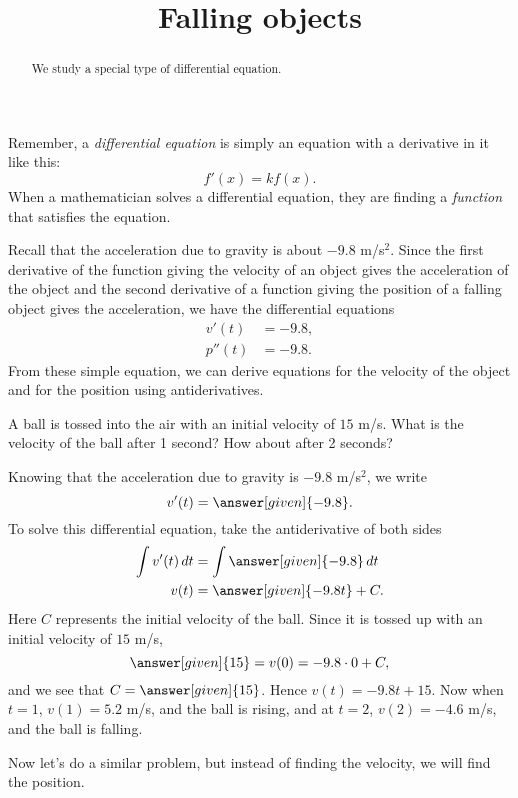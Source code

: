 \documentclass{ximera}
\title[Dig-In:]{Falling objects}
\begin{document}
\begin{abstract}
  We study a special type of differential equation.
\end{abstract}
\maketitle

Remember, a \textit{differential equation} is simply an equation with a derivative in it like this:
\[
f'(x) = k f(x).
\]
When a mathematician solves a differential equation, they are finding
a \textit{function} that satisfies the equation.


Recall that the acceleration due to gravity is about $-9.8$
m/s$^2$. Since the first derivative of the function giving the
velocity of an object gives the acceleration of the object and the
second derivative of a function giving the position of a falling
object gives the acceleration, we have the differential equations
\begin{align*}
v'(t) &=  -9.8,\\
p''(t) &=  -9.8.
\end{align*}
From these simple equation, we can derive equations for the velocity of
the object and for the position using antiderivatives.


\begin{example}
A ball is tossed into the air with an initial velocity of $15$
m/s. What is the velocity of the ball after 1 second? How about after
2 seconds?
\begin{explanation}
Knowing that the acceleration due to gravity is $-9.8$ m/s$^2$, we write
\[
v'(t) = \answer[given]{-9.8}.
\]
To solve this differential equation, take the antiderivative of both sides
\begin{align*}
\int v'(t) \d t &= \int \answer[given]{-9.8} \d t\\
v(t) &= \answer[given]{-9.8 t} + C.
\end{align*}
Here $C$ represents the initial velocity of the ball. Since it is
tossed up with an initial velocity of $15$ m/s, 
\[
\answer[given]{15} = v(0) = -9.8\cdot 0 + C,
\]
and we see that $C=\answer[given]{15}$. Hence $v(t) = -9.8t + 15$. Now when $t=1$,
$v(1) = 5.2$ m/s, and the ball is rising, and at $t=2$, $v(2) = -4.6$ m/s,
and the ball is falling.
\end{explanation}
\end{example}

Now let's do a similar problem, but instead of finding the velocity,
we will find the position.
\end{document}
